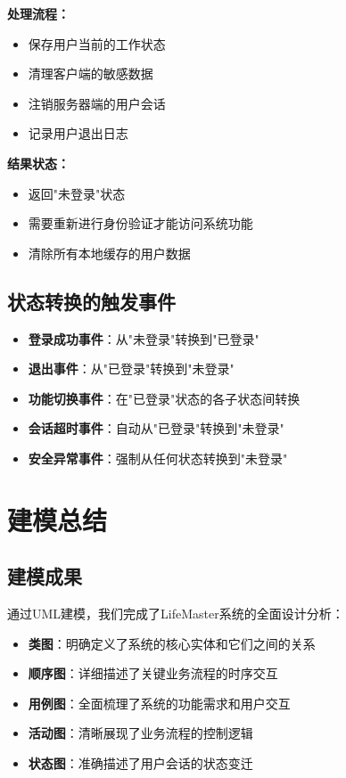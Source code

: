 \documentclass[a4paper]{article}
\begin{document}
\textbf{处理流程：}
\begin{itemize}
    \item 保存用户当前的工作状态
    \item 清理客户端的敏感数据
    \item 注销服务器端的用户会话
    \item 记录用户退出日志
\end{itemize}

\textbf{结果状态：}
\begin{itemize}
    \item 返回"未登录"状态
    \item 需要重新进行身份验证才能访问系统功能
    \item 清除所有本地缓存的用户数据
\end{itemize}

\subsection{状态转换的触发事件}

\begin{itemize}
    \item \textbf{登录成功事件}：从"未登录"转换到"已登录"
    \item \textbf{退出事件}：从"已登录"转换到"未登录"
    \item \textbf{功能切换事件}：在"已登录"状态的各子状态间转换
    \item \textbf{会话超时事件}：自动从"已登录"转换到"未登录"
    \item \textbf{安全异常事件}：强制从任何状态转换到"未登录"
\end{itemize}

\section{建模总结}

\subsection{建模成果}

通过UML建模，我们完成了LifeMaster系统的全面设计分析：

\begin{itemize}
    \item \textbf{类图}：明确定义了系统的核心实体和它们之间的关系
    \item \textbf{顺序图}：详细描述了关键业务流程的时序交互
    \item \textbf{用例图}：全面梳理了系统的功能需求和用户交互
    \item \textbf{活动图}：清晰展现了业务流程的控制逻辑
    \item \textbf{状态图}：准确描述了用户会话的状态变迁
\end{itemize}
\end{document}
